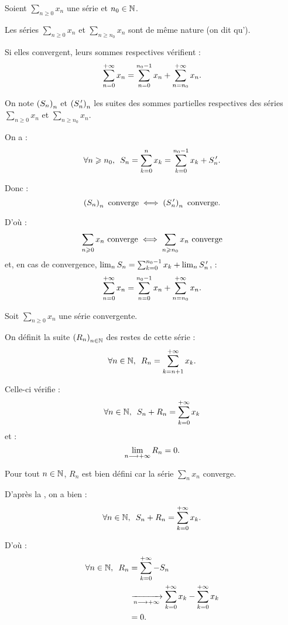 \begin{rem}
Soient \(\sum_{n\geq0}x_n\) une série et \(n_0\in\mathbb{N}\).

Les séries \(\sum_{n\geq0}x_n\) et \(\sum_{n\geq n_0}x_n\) sont de même nature (on dit qu').

Si elles convergent, leurs sommes respectives vérifient : \[\sum_{n=0}^{+\infty}x_n=\sum_{n=0}^{n_0-1}x_n+\sum_{n=n_0}^{+\infty}x_n.\]
\end{rem}

\begin{dem}
On note \(\left(S_n\right)_n\) et \(\left(S_n^{\,\prime}\right)_n\) les suites des sommes partielles respectives des séries \(\sum_{n\geq0}x_n\) et \(\sum_{n\geq n_0}x_n\).

On a : \[\quantifs{\forall n\geq n_0}S_n=\sum_{k=0}^nx_k=\sum_{k=0}^{n_0-1}x_k+S_n\prim.\]

Donc : \[\left(S_n\right)_n\text{ converge}\iff\left(S_n^{\,\prime}\right)_n\text{ converge}.\]

D'où : \[\sum_{n\geqslant0}x_n\text{ converge}\iff\sum_{n\geqslant n_0}x_n\text{ converge}\] et, en cas de convergence, \(\lim_nS_n=\sum_{k=0}^{n_0-1}x_k+\lim_nS_n^{\,\prime}\), \cad : \[\sum_{n=0}^{+\infty}x_n=\sum_{n=0}^{n_0-1}x_n+\sum_{n=n_0}^{+\infty}x_n.\]
\end{dem}

\begin{defprop}
Soit \(\sum_{n\geq0}x_n\) une série convergente.

On définit la suite \(\left(R_n\right)_{n\in\mathbb{N}}\) des restes de cette série : \[\quantifs{\forall n\in\N}R_n=\sum_{k=n+1}^{\pinf}x_k.\]

Celle-ci vérifie : \[\quantifs{\forall n\in\N}S_n+R_n=\sum_{k=0}^{\pinf}x_k\] et : \[\lim_{n\longrightarrow+\infty}R_n=0.\]
\end{defprop}

\begin{dem}
Pour tout \(n\in\mathbb{N}\), \(R_n\) est bien défini car la série \(\sum_nx_n\) converge.

D'après la , on a bien : \[\quantifs{\forall n\in\N}S_n+R_n=\sum_{k=0}^{\pinf}x_k.\]

D'où : \[\begin{aligned}
\quantifs{\forall n\in\N}R_n&=\sum_{k=0}^{\pinf}-S_n \\
&\tendqd{n\to\pinf}\sum_{k=0}^{\pinf}x_k-\sum_{k=0}^{\pinf}x_k \\
&=0.
\end{aligned}\]
\end{dem}

